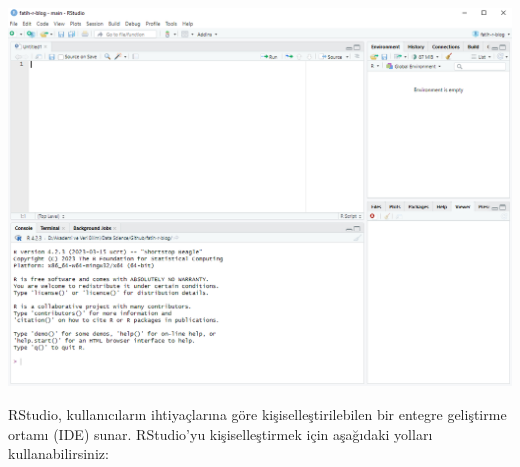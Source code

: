 \documentclass[
  letterpaper,
  DIV=11,
  numbers=noendperiod]{scrreprt}
\begin{document}
\includegraphics{images/RStudio.PNG}

RStudio, kullanıcıların ihtiyaçlarına göre kişiselleştirilebilen bir
entegre geliştirme ortamı (IDE) sunar. RStudio'yu kişiselleştirmek için
aşağıdaki yolları kullanabilirsiniz:
\end{document}
